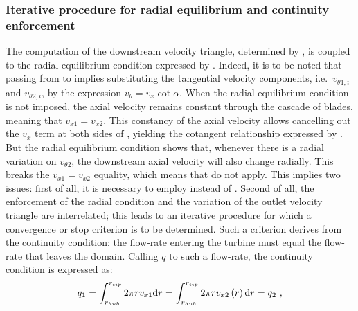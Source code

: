 \subsubsection*{Iterative procedure for radial equilibrium and continuity enforcement}{\label{subsubsec:iterative_procedure_continuity_enforcement}}
The computation of the downstream velocity triangle, determined by , is coupled to the radial equilibrium condition expressed by . Indeed, it is to be noted that passing from  to  implies substituting the tangential velocity components, i.e.\ $v_{\theta1,i}$ and $v_{\theta2,i}$, by the expression $v_{\theta}=v_{x}\cot{\alpha}$. When the radial equilibrium condition is not imposed, the axial velocity remains constant through the cascade of blades, meaning that $v_{x1}=v_{x2}$. This constancy of the axial velocity allows cancelling out the $v_{x}$ term at both sides of , yielding the cotangent relationship expressed by .\\
But the radial equilibrium condition shows that, whenever there is a radial variation on $v_{\theta2}$, the downstream axial velocity will also change radially. This breaks the $v_{x1}=v_{x2}$ equality, which means that  do not apply. This implies two issues: first of all, it is necessary to employ  instead of . Second of all, the enforcement of the radial condition and the variation of the outlet velocity triangle are interrelated; this leads to an iterative procedure for which a convergence or stop criterion is to be determined. Such a criterion derives from the continuity condition: the flow-rate entering the turbine must equal the flow-rate that leaves the domain. Calling $q$ to such a flow-rate, the continuity condition is expressed as:
\begin{equation}{\label{eq:continuity_criterion}}
	q_{1}=\int_{r_{hub}}^{r_{tip}}2\pi{r}v_{x1}\mathrm{d}r=\int_{r_{hub}}^{r_{tip}}2\pi{r}v_{x2}\left(r\right)\mathrm{d}r=q_{2} \ ,
\end{equation}
